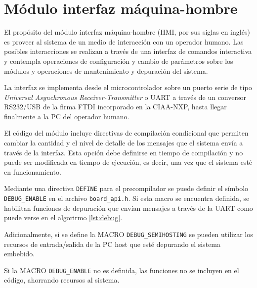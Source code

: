 \section{Módulo interfaz máquina-hombre}
\label{sec:HMI}

El propósito del módulo interfaz máquina-hombre (HMI, por sus siglas en inglés) es proveer al sistema de un medio de interacción con un operador humano. Las posibles interacciones se realizan a través de una interfaz de comandos interactiva y contempla operaciones de configuración y cambio de parámetros sobre los módulos y operaciones de mantenimiento y depuración del sistema.  

La interfaz se implementa desde el microcontrolador sobre un puerto serie de tipo \textit{Universal Asynchronous Receiver-Transmitter} o UART a través de un conversor RS232/USB de la firma FTDI incorporado en la CIAA-NXP, hasta llegar finalmente a la PC del operador humano.

El código del módulo incluye directivas de compilación condicional que permiten cambiar la cantidad y el nivel de detalle de los mensajes que el sistema envía a través de la interfaz.  Esta opción debe definirse en tiempo de compilación y no puede ser modificada en tiempo de ejecución, es decir, una vez que el sistema esté en funcionamiento.  

Mediante una directiva \texttt{DEFINE} para el precompilador se puede definir el símbolo \texttt{DEBUG\_ENABLE} en el archivo \texttt{board\_api.h}.   Si esta macro se encuentra definida, se habilitan funciones de depuración que envían mensajes a través de la UART como puede verse en el algorirmo \ref{lst:debug}.  


Adicionalmente, si se define la MACRO \texttt{DEBUG\_SEMIHOSTING} se pueden utilizar los recursos de entrada/salida de la PC host que esté depurando el sistema embebido. 

Si la MACRO \texttt{DEBUG\_ENABLE} no es definida, las funciones no se incluyen en el código, ahorrando recursos al sistema.

\vspace{10px}

